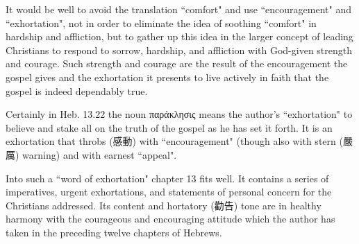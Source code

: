 It would be well to avoid the translation ``comfort" and use ``encouragement"
and ``exhortation", not in order to eliminate the idea of soothing ``comfort"
in hardship and affliction, but to gather up this idea in the larger concept of
leading Christians to respond to sorrow, hardship, and affliction with
God-given strength and courage.
Such strength and courage are the result of the encouragement the gospel gives
and the exhortation it presents to live actively in faith that the gospel is
indeed dependably true.
\newline

Certainly in Heb. 13.22 the noun παράκλησις means the author's ``exhortation"
to believe and stake all on the truth of the gospel as he has set it forth.
It is an exhortation that throbs (感動) with ``encouragement" (though also with
stern (嚴厲) warning) and with earnest ``appeal".
\newline

Into such a ``word of exhortation" chapter 13 fits well.
It contains a series of imperatives, urgent exhortations, and statements of
personal concern for the Christians addressed.
Its content and hortatory (勸告) tone are in healthy harmony with the
courageous and encouraging attitude which the author has taken in the preceding
twelve chapters of Hebrews.
